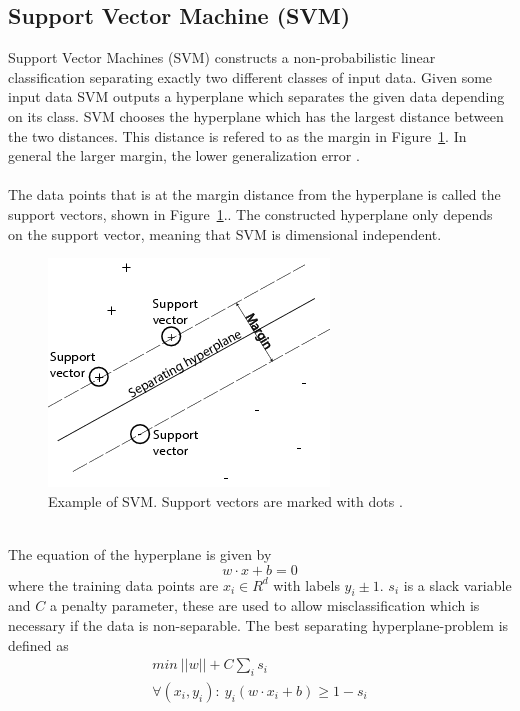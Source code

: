 \subsection{Support Vector Machine (SVM)}
Support Vector Machines (SVM) constructs a non-probabilistic linear classification separating exactly two different classes of input data. Given some input data SVM outputs a hyperplane which separates the given data depending on its class. SVM chooses the hyperplane which has the largest distance between the two distances. This distance is refered to as the margin in Figure~\ref{fig:svm}. In general the larger margin, the lower generalization error \citep{svm_ai}.  \\\\
The data points that is at the margin distance from the hyperplane is called the support vectors, shown in Figure~\ref{fig:svm}.. The constructed hyperplane only depends on the support vector, meaning that SVM is dimensional independent.
\begin{figure}[h!]
\centering
\includegraphics[scale = 0.7]{../Plottar/svmhyperplane.png}
\caption{Example of SVM. Support vectors are marked with dots \citep{svm_picture}. }
\label{fig:svm}
\end{figure} \\
The equation of the hyperplane is given by
\begin{equation}
w \cdot x + b = 0
\end{equation}
where the training data points are $x_i \in R^d$ with labels $y_i \pm 1$. $s_i$ is a slack variable and $C$ a penalty parameter, these are used to allow misclassification which is necessary if the data is non-separable. The best separating hyperplane-problem is defined as
\begin{equation}
\begin{array}{l}
min \: ||w|| + C \sum_{i} s_i \\
\forall (x_i, y_i) : \: y_i(w \cdot x_i + b) \geq 1 - s_i
\end{array}
\end{equation}
